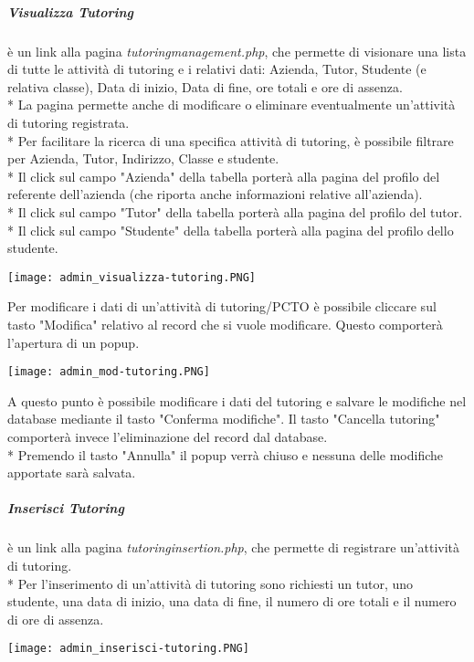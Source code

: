 \documentclass[12pt]{article}
\begin{document}
\subparagraph{Visualizza Tutoring} è un link alla pagina \textit{tutoringmanagement.php}, che permette di visionare una lista di tutte le attività di tutoring e i relativi dati: Azienda, Tutor, Studente (e relativa classe), Data di inizio, Data di fine, ore totali e ore di assenza.\\*
La pagina permette anche di modificare o eliminare eventualmente un'attività di tutoring registrata.\\*
Per facilitare la ricerca di una specifica attività di tutoring, è possibile filtrare per Azienda, Tutor, Indirizzo, Classe e studente.\\*
Il click sul campo "Azienda" della tabella porterà alla pagina del profilo del referente dell'azienda (che riporta anche informazioni relative all'azienda).\\*
Il click sul campo "Tutor" della tabella porterà alla pagina del profilo del tutor.\\*
Il click sul campo "Studente" della tabella porterà alla pagina del profilo dello studente.
\begin{center}
    \texttt{[image: admin\_visualizza-tutoring.PNG]}
\end{center}

Per modificare i dati di un'attività di tutoring/PCTO è possibile cliccare sul tasto "Modifica" relativo al record che si vuole modificare. Questo comporterà l'apertura di un popup.
\begin{center}
    \texttt{[image: admin\_mod-tutoring.PNG]}
\end{center}

A questo punto è possibile modificare i dati del tutoring e salvare le modifiche nel database mediante il tasto "Conferma modifiche". Il tasto "Cancella tutoring" comporterà invece l'eliminazione del record dal database.\\*
Premendo il tasto "Annulla" il popup verrà chiuso e nessuna delle modifiche apportate sarà salvata.


\subparagraph{Inserisci Tutoring} è un link alla pagina \textit{tutoringinsertion.php}, che permette di registrare un'attività di tutoring.\\*
Per l'inserimento di un'attività di tutoring sono richiesti un tutor, uno studente, una data di inizio, una data di fine, il numero di ore totali e il numero di ore di assenza.

\begin{center}
    \texttt{[image: admin\_inserisci-tutoring.PNG]}
\end{center}
\end{document}
